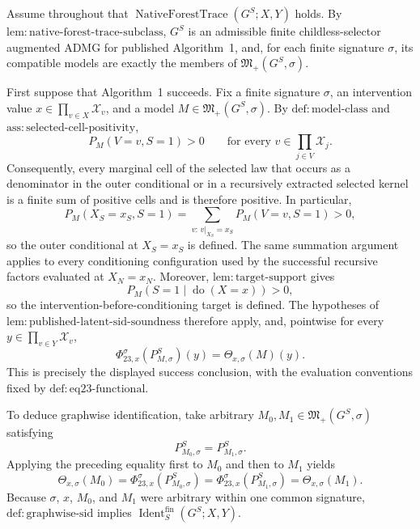 Assume throughout that \(\operatorname{NativeForestTrace}(G^S;X,Y)\) holds.  By \(\mathrm{lem:native\text{-}forest\text{-}trace\text{-}subclass}\), \(G^S\) is an admissible finite childless-selector augmented ADMG for published Algorithm~1, and, for each finite signature \(\sigma\), its compatible models are exactly the members of \(\mathfrak M_+(G^S,\sigma)\).

First suppose that Algorithm~1 succeeds.  Fix a finite signature \(\sigma\), an intervention value \(x\in\prod_{v\in X}\mathcal X_v\), and a model \(M\in\mathfrak M_+(G^S,\sigma)\).  By \(\mathrm{def:model\text{-}class}\) and \(\mathrm{ass:selected\text{-}cell\text{-}positivity}\),
\[
 P_M(V=v,S=1)>0
 \qquad\text{for every }v\in\prod_{j\in V}\mathcal X_j.
\]
Consequently, every marginal cell of the selected law that occurs as a denominator in the outer conditional or in a recursively extracted selected kernel is a finite sum of positive cells and is therefore positive.  In particular,
\[
 P_M(X_S=x_S,S=1)
 =\sum_{v:\,v|_{X_S}=x_S}P_M(V=v,S=1)>0,
\]
so the outer conditional at \(X_S=x_S\) is defined.  The same summation argument applies to every conditioning configuration used by the successful recursive factors evaluated at \(X_N=x_N\).  Moreover, \(\mathrm{lem:target\text{-}support}\) gives
\[
 P_M(S=1\mid\operatorname{do}(X=x))>0,
\]
so the intervention-before-conditioning target is defined.  The hypotheses of \(\mathrm{lem:published\text{-}latent\text{-}sid\text{-}soundness}\) therefore apply, and, pointwise for every \(y\in\prod_{v\in Y}\mathcal X_v\),
\[
 \Phi_{23,x}^{\sigma}(P_{M,\sigma}^S)(y)
 =\Theta_{x,\sigma}(M)(y).
\]
This is precisely the displayed success conclusion, with the evaluation conventions fixed by \(\mathrm{def:eq23\text{-}functional}\).

To deduce graphwise identification, take arbitrary \(M_0,M_1\in\mathfrak M_+(G^S,\sigma)\) satisfying
\[
 P_{M_0,\sigma}^S=P_{M_1,\sigma}^S.
\]
Applying the preceding equality first to \(M_0\) and then to \(M_1\) yields
\[
 \Theta_{x,\sigma}(M_0)
 =\Phi_{23,x}^{\sigma}(P_{M_0,\sigma}^S)
 =\Phi_{23,x}^{\sigma}(P_{M_1,\sigma}^S)
 =\Theta_{x,\sigma}(M_1).
\]
Because \(\sigma\), \(x\), \(M_0\), and \(M_1\) were arbitrary within one common signature, \(\mathrm{def:graphwise\text{-}sid}\) implies \(\operatorname{Ident}^{\mathrm{fin}}_S(G^S;X,Y)\).

